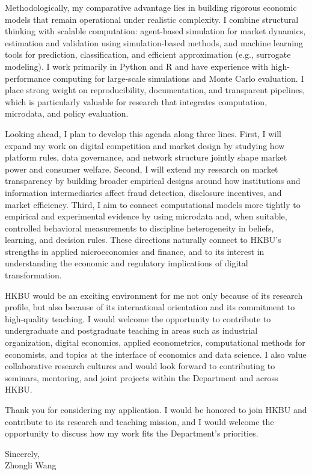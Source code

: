 \documentclass[11pt]{article}
\begin{document}
Methodologically, my comparative advantage lies in building rigorous economic models that remain operational under realistic complexity. I combine structural thinking with scalable computation: agent-based simulation for market dynamics, estimation and validation using simulation-based methods, and machine learning tools for prediction, classification, and efficient approximation (e.g., surrogate modeling). I work primarily in Python and R and have experience with high-performance computing for large-scale simulations and Monte Carlo evaluation. I place strong weight on reproducibility, documentation, and transparent pipelines, which is particularly valuable for research that integrates computation, microdata, and policy evaluation.

Looking ahead, I plan to develop this agenda along three lines. First, I will expand my work on digital competition and market design by studying how platform rules, data governance, and network structure jointly shape market power and consumer welfare. Second, I will extend my research on market transparency by building broader empirical designs around how institutions and information intermediaries affect fraud detection, disclosure incentives, and market efficiency. Third, I aim to connect computational models more tightly to empirical and experimental evidence by using microdata and, when suitable, controlled behavioral measurements to discipline heterogeneity in beliefs, learning, and decision rules. These directions naturally connect to HKBU’s strengths in applied microeconomics and finance, and to its interest in understanding the economic and regulatory implications of digital transformation.

HKBU would be an exciting environment for me not only because of its research profile, but also because of its international orientation and its commitment to high-quality teaching. I would welcome the opportunity to contribute to undergraduate and postgraduate teaching in areas such as industrial organization, digital economics, applied econometrics, computational methods for economists, and topics at the interface of economics and data science. I also value collaborative research cultures and would look forward to contributing to seminars, mentoring, and joint projects within the Department and across HKBU.

Thank you for considering my application. I would be honored to join HKBU and contribute to its research and teaching mission, and I would welcome the opportunity to discuss how my work fits the Department’s priorities.

\vspace{4mm}

Sincerely,\\[10mm]
Zhongli Wang
\end{document}
